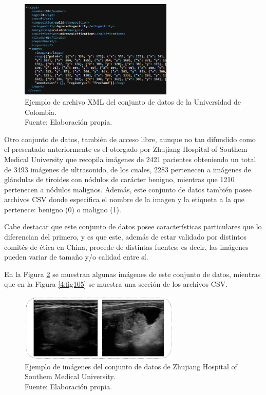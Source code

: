 \begin{figure}[H]
	\begin{center}
		\includegraphics[width=0.65\textwidth]{4/figures/xmlfile.png}
		\caption[Ejemplo de archivo XML del conjunto de datos de la Universidad de Colombia]{Ejemplo de archivo XML del conjunto de datos de la Universidad de Colombia. \\
		Fuente: Elaboración propia.}
		\label{4:fig103}
	\end{center}
\end{figure}

Otro conjunto de datos, también de acceso libre, aunque no tan difundido como el presentado anteriormente es el otorgado por Zhujiang Hospital of Southem Medical University que recopila imágenes de 2421 pacientes obteniendo un total de 3493 imágenes de ultrasonido, de los cuales, 2283 pertenecen a imágenes de glándulas de tiroides con nódulos de carácter benigno, mientras que 1210 pertenecen a nódulos malignos. Además, este conjunto de datos también posee archivos CSV donde especifica el nombre de la imagen y la etiqueta a la que pertenece: benigno (0) o maligno (1).

Cabe destacar que este conjunto de datos posee características particulares que lo diferencian del primero, y es que este, además de estar validado por distintos comités de ética en China, procede de distintas fuentes; es decir, las imágenes pueden variar de tamaño y/o calidad entre sí.

En la Figura \ref{4:fig104} se muestran algunas imágenes de este conjunto de datos, mientras que en la Figura \ref{4:fig105} se muestra una sección de los archivos CSV.

\begin{figure}[H]
	\begin{center}
		\includegraphics[width=0.68\textwidth]{4/figures/tn3k_examp.png}
		\caption[Ejemplo de imágenes del conjunto de datos de Zhujiang Hospital of Southem Medical University]{Ejemplo de imágenes del conjunto de datos de Zhujiang Hospital of Southem Medical University. \\
		Fuente: Elaboración propia.}
		\label{4:fig104}
	\end{center}
\end{figure}

